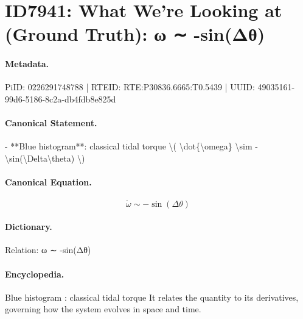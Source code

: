\section*{ID7941: What We’re Looking at (Ground Truth): ω ∼ -sin(Δθ)}
\paragraph{Metadata.}
PiID: 0226291748788 | RTEID: RTE:P30836.6665:T0.5439 | UUID: 49035161-99d6-5186-8c2a-db4fdb8e825d

\paragraph{Canonical Statement.}
- **Blue histogram**: classical tidal torque \textbackslash{}( \textbackslash{}dot\{\textbackslash{}omega\} \textbackslash{}sim -\textbackslash{}sin(\textbackslash{}Delta\textbackslash{}theta) \textbackslash{})

\paragraph{Canonical Equation.}
\[
\dot{\omega} \sim -\sin(\Delta\theta)
\]

\paragraph{Dictionary.}
Relation: ω ∼ -sin(Δθ)

\paragraph{Encyclopedia.}
Blue histogram : classical tidal torque It relates the quantity to its derivatives, governing how the system evolves in space and time.

